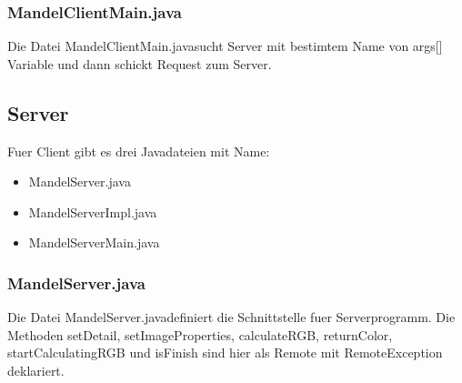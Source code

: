 \documentclass{article}
\begin{document}
	\newpage
	\subsubsection{MandelClientMain.java}
	Die Datei \glqq MandelClientMain.java\grqq sucht Server mit bestimtem Name von args[] Variable und dann schickt Request zum Server.
	

	\newpage
	\subsection{Server}
	Fuer Client gibt es drei Javadateien mit Name:
	\begin{itemize}
		\item MandelServer.java
		\item MandelServerImpl.java
		\item MandelServerMain.java
	\end{itemize}
	
	\subsubsection{MandelServer.java}
	Die Datei \glqq MandelServer.java\grqq definiert die Schnittstelle fuer Serverprogramm. Die Methoden setDetail, setImageProperties, calculateRGB, returnColor, startCalculatingRGB und isFinish sind hier als Remote mit RemoteException deklariert.
	
	
	\newpage	
\end{document}

